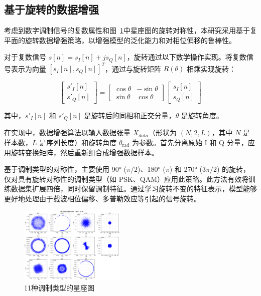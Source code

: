 \documentclass[conference]{IEEEtran}
\begin{document}
\subsection{基于旋转的数据增强}


考虑到数字调制信号的复数属性和图~\ref{fig:constellation}中星座图的旋转对称性，本研究采用基于复平面的旋转数据增强策略，以增强模型的泛化能力和对相位偏移的鲁棒性。

对于复数信号 \(s[n] = s_I[n] + j s_Q[n]\)，旋转通过以下数学操作实现。将复数信号表示为向量 \([s_I[n], s_Q[n]]^T\)，通过与旋转矩阵 \(R(\theta)\) 相乘实现旋转：

\begin{equation}
\begin{bmatrix} s'_I[n] \\ s'_Q[n] \end{bmatrix} = \begin{bmatrix} \cos\theta & -\sin\theta \\ \sin\theta & \cos\theta \end{bmatrix} \begin{bmatrix} s_I[n] \\ s_Q[n] \end{bmatrix}
\end{equation}

其中，\(s'_I[n]\) 和 \(s'_Q[n]\) 是旋转后的同相和正交分量，\(\theta\) 是旋转角度。

在实现中，数据增强算法以输入数据张量 \(X_{data}\)（形状为 \((N, 2, L)\)，其中 \(N\) 是样本数，\(L\) 是序列长度）和旋转角度 \(\theta_{\text{rad}}\) 为参数。首先分离原始 I 和 Q 分量，应用旋转变换矩阵，然后重新组合成增强数据样本。

基于调制类型的对称性，主要使用 90° (\(\pi/2\))、180° (\(\pi\)) 和 270° (\(3\pi/2\)) 的旋转，仅对具有旋转对称性的调制类型（如 PSK、QAM）应用此策略。此方法有效将训练数据集扩展四倍，同时保留调制特征。通过学习旋转不变的特征表示，模型能够更好地处理由于载波相位偏移、多普勒效应等引起的信号旋转。

\begin{figure}[htbp]
\centering
\includegraphics[width=0.45\textwidth]{figure/constellation.png}
\caption{11种调制类型的星座图}
\label{fig:constellation}
\end{figure}
\end{document}
